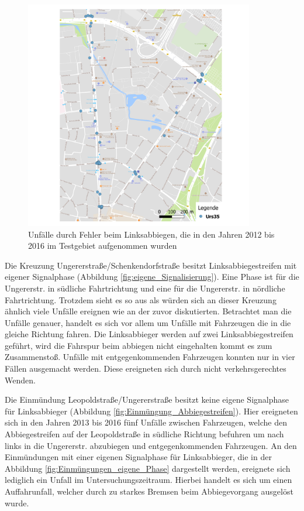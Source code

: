 \begin{savenotes}
	\begin{figure}[H]
		\centering
		\includegraphics[width=10cm,height=10cm]{figures/map_Urs35}
		\caption[Unfälle durch Fehler beim Linksabbiegen, die in den Jahren 2012 bis 2016 im Testgebiet aufgenommen wurden]{Unfälle durch Fehler beim Linksabbiegen, die in den Jahren 2012 bis 2016 im Testgebiet aufgenommen wurden}\label{fig:map_Urs35}
	\end{figure}
\end{savenotes}

Die Kreuzung Ungererstraße/Schenkendorfstraße besitzt Linksabbiegestreifen mit eigener Signalphase (Abbildung  \ref{fig:eigene_Signalisierung}). Eine Phase ist für die Ungererstr. in südliche Fahrtrichtung und eine für die Ungererstr. in nördliche Fahrtrichtung. Trotzdem sieht es so aus als würden sich an dieser Kreuzung ähnlich viele Unfälle ereignen wie an der zuvor diskutierten. Betrachtet man die Unfälle genauer, handelt es sich vor allem um Unfälle mit Fahrzeugen die in die gleiche Richtung fahren. Die Linksabbieger werden auf zwei Linksabbiegestreifen geführt, wird die Fahrspur beim abbiegen nicht eingehalten kommt es zum Zusammenstoß. Unfälle mit entgegenkommenden Fahrzeugen konnten nur in vier Fällen ausgemacht werden. Diese ereigneten sich durch nicht verkehrsgerechtes Wenden.

Die Einmündung Leopoldstraße/Ungererstraße besitzt keine eigene Signalphase für Linksabbieger (Abbildung \ref{fig:Einmüngung_Abbiegestreifen}). Hier ereigneten sich in den Jahren 2013 bis 2016 fünf Unfälle zwischen Fahrzeugen, welche den Abbiegestreifen auf der Leopoldstraße in südliche Richtung befuhren um nach links in die Ungererstr. abzubiegen und entgegenkommenden Fahrzeugen. An den Einmündungen mit einer eigenen Signalphase für Linksabbieger, die in der Abbildung \ref{fig:Einmüngungen_eigene_Phase} dargestellt werden, ereignete sich lediglich ein Unfall im Untersuchungszeitraum. Hierbei handelt es sich um einen Auffahrunfall, welcher durch zu starkes Bremsen beim Abbiegevorgang ausgelöst wurde.

